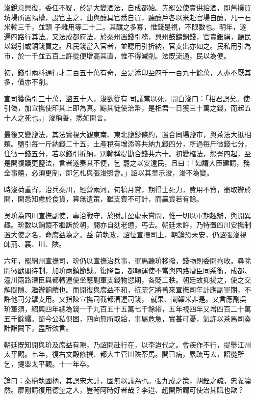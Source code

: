 \begin{pinyinscope}
 浚銳意興復，委任不疑，於是大變酒法，自成都始。先罷公使賣供給酒，即舊撲買坊場所置隔槽，設官主之，曲與釀具官悉自買，聽釀戶各以米赴官場自釀，凡一石米輸三千，並頭
 子雜用等二十二。其釀之多寡，惟錢是視，不限數也。明年，遂遍四路行其法。又法成都府法，於秦州置錢引務，興州鼓鑄銅錢，官賣銀絹，聽民以錢引或銅錢買之。凡民錢當入官者，並聽用引折納，官支出亦如之。民私用引為市，於一千並五百上許從便增高其直，惟不得減削。法既流通，民以為便。



 初，錢引兩料通行才二百五十萬有奇，至是添印至四千一百九十餘萬，人亦不厭其多，價亦不削。



 宣司獲偽引三十萬，盜五十人，浚欲從有
 司議當以死，開白浚曰：「相君誤矣。使引偽，加宣撫使印其上即為真。黥其徒使治幣，是相君一日獲三十萬之錢，而起五十人之死也。」浚稱善，悉如開言。



 最後又變鹽法，其法實視大觀東南、東北鹽鈔條約，置合同場鹽市，與茶法大抵相類。鹽引每一斤納錢二十五，土產稅有增添等共納九錢四分，所過每斤徵錢七分，住徵一錢五分，若以錢引折納，別輸稱提勘合錢共六十。初變榷法，怨詈四起，至是開復議更鹽法，言者遂奏其不便，乞
 罷之以安遠民，且曰：「如謂大臣建請，務全事體，必須更制，即乞札與張浚照會。」詔以其章示浚，浚不為變。



 時浚荷重寄，治兵秦川，經營兩河，旬犒月賞，期得士死力，費用不貲，盡取辦於開，開悉知慮於食貨，算無遺策，雖支費不可計，而贏貲若有餘。



 吳玠為四川宣撫副使，專治戰守，於財計盈虛未嘗問，惟一切以軍期趣辦，與開異趣。玠數以餉饋不繼訴於朝，開亦自劾老憊，丐去。朝廷未許，乃特置四川安撫制置大使之名，命席益為之。益
 前執政，詔位宣撫司上，朝論恐未安，仍詔張浚視師荊、襄、川、陜。



 六年，罷綿州宣撫司，玠仍以宣撫治兵事，軍馬聽玠移撥，錢物則委開拘收。尋除開徽猷閣待制，加玠兩鎮節鉞。復降旨，都轉運使不當與四路漕臣同系銜，成都、潼川兩路漕臣與都轉運使坐應副軍支錢物愆期，各貶二秩。朝廷故抑揚之，使之交解間隙、趣辦餉饋也。而開復與席益不和，抗疏乞將舊來宣撫司年計應副軍期，不許他司分擘支用。又指陳宣撫司截都漕運司錢，
 就果、閬糴米非是。又言應副吳玠軍須，紹興四年總為錢一千九百五十五萬七千餘緡，五年視四年又增四百二十萬五千餘緡。蜀今公私俱困，四向無所取給，事屬危急，實甚可憂，氣許以茶馬司奏計詣闕下，盡所欲言。



 朝廷既知開與玠及席益有隙，乃詔開赴行在，以李迨代之。會疾作不行，提舉江州太平觀。七年，復右文殿修撰、都大主管川陜茶馬。開已病，累疏丐去，詔從所乞，提舉太平觀。十一年卒。



 論曰：秦檜執國柄，其誤宋大計，固無以議為也。張九成之策，胡銓之疏，忠義凜然。廖剛請復用德望之人，豈茍阿時好者哉？李迨、趙開所謂可使治其賦也歟？



\end{pinyinscope}